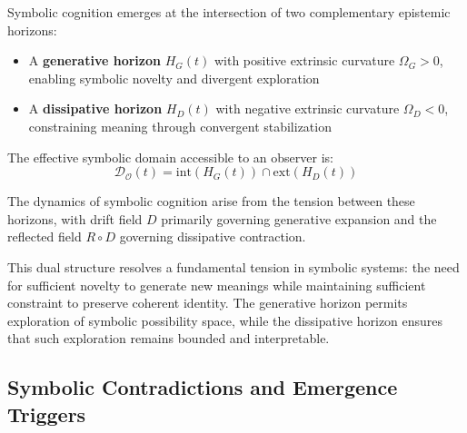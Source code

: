 \begin{axiom}
\label{axiom:bk1_dual_horizon_postulate}
Symbolic cognition emerges at the intersection of two complementary epistemic horizons:
\begin{itemize}
    \item A \textbf{generative horizon} $H_G(t)$ with positive extrinsic curvature $\Omega_G > 0$, enabling symbolic novelty and divergent exploration
    \item A \textbf{dissipative horizon} $H_D(t)$ with negative extrinsic curvature $\Omega_D < 0$, constraining meaning through convergent stabilization
\end{itemize}

The effective symbolic domain accessible to an observer is:
\[
\mathcal{D}_\mathcal{O}(t) = \text{int}(H_G(t)) \cap \text{ext}(H_D(t))
\]

The dynamics of symbolic cognition arise from the tension between these horizons, with drift field $D$ primarily governing generative expansion and the reflected field $R \circ D$ governing dissipative contraction.
\end{axiom}

This dual structure resolves a fundamental tension in symbolic systems: the need for sufficient novelty to generate new meanings while maintaining sufficient constraint to preserve coherent identity. The generative horizon permits exploration of symbolic possibility space, while the dissipative horizon ensures that such exploration remains bounded and interpretable.

\subsection{Symbolic Contradictions and Emergence Triggers}
\label{subsec:bk1_contradictions_emergence_triggers}

